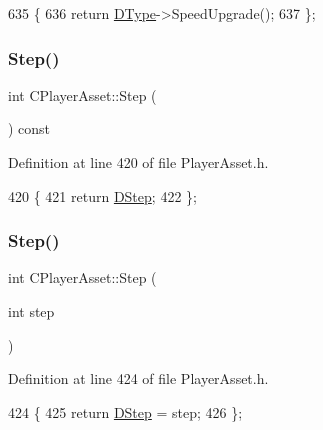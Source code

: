 \begin{DoxyCode}
635                                 \{
636             \textcolor{keywordflow}{return} \hyperlink{classCPlayerAsset_a5d61f73471e1e6f0a6ab15f2ffa7b359}{DType}->SpeedUpgrade();
637         \};
\end{DoxyCode}
\hypertarget{classCPlayerAsset_a787d4ac869cf7b5525b9a81f5d1bb5b1}{}\label{classCPlayerAsset_a787d4ac869cf7b5525b9a81f5d1bb5b1} 
\subsubsection{\texorpdfstring{Step()}{Step()}\hspace{0.1cm}{\footnotesize\ttfamily [1/2]}}
{\footnotesize\ttfamily int C\+Player\+Asset\+::\+Step (\begin{DoxyParamCaption}{ }\end{DoxyParamCaption}) const\hspace{0.3cm}{\ttfamily [inline]}}



Definition at line 420 of file Player\+Asset.\+h.


\begin{DoxyCode}
420                         \{
421             \textcolor{keywordflow}{return} \hyperlink{classCPlayerAsset_a7964d2161d51b3edd66fbc9c59eba4b0}{DStep};  
422         \};
\end{DoxyCode}
\hypertarget{classCPlayerAsset_aaa8c5b62f8c2c3bf05443c88e1619517}{}\label{classCPlayerAsset_aaa8c5b62f8c2c3bf05443c88e1619517} 
\subsubsection{\texorpdfstring{Step()}{Step()}\hspace{0.1cm}{\footnotesize\ttfamily [2/2]}}
{\footnotesize\ttfamily int C\+Player\+Asset\+::\+Step (\begin{DoxyParamCaption}\item[{int}]{step }\end{DoxyParamCaption})\hspace{0.3cm}{\ttfamily [inline]}}



Definition at line 424 of file Player\+Asset.\+h.


\begin{DoxyCode}
424                           \{
425             \textcolor{keywordflow}{return} \hyperlink{classCPlayerAsset_a7964d2161d51b3edd66fbc9c59eba4b0}{DStep} = step;  
426         \};
\end{DoxyCode}
\hypertarget{classCPlayerAsset_aaaea60176986f3e4f464bf5cec056521}{}\label{classCPlayerAsset_aaaea60176986f3e4f464bf5cec056521} 
